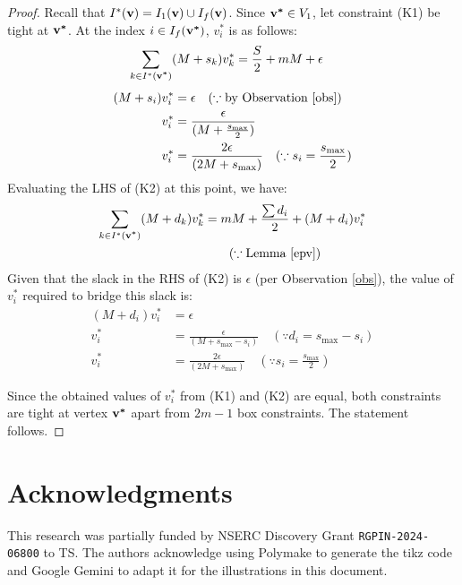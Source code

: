 \documentclass[3p, twocolumn]{elsarticle}
\def\ve#1{\mathchoice{\mbox{\boldmath$\displaystyle\bf#1$}}
{\mbox{\boldmath$\textstyle\bf#1$}}
{\mbox{\boldmath$\scriptstyle\bf#1$}}
{\mbox{\boldmath$\scriptscriptstyle\bf#1$}}}
\begin{document}
\begin{proof}
    Recall that $I^*(\ve{v}) = I_1(\ve{v}) \cup I_f(\ve{v})$. Since $\ve{v^*}\in V_1$, let constraint (K1) be tight at $\ve{v^*}$. At the index $i \in I_f(\ve{v^*})$, $v^*_i$ is as follows:
    \begin{align*}
    \sum_{k \in I^*(\ve{v^*})}(M+s_k)v^*_k &=  \frac{S}{2} + mM + \epsilon    
    \end{align*}
    \begin{align*}
        (M+s_i)v^*_i &= \epsilon \quad (\because \text{by Observation \ref{obs}}) \\
        v^*_i &= \frac{\epsilon}{(M+\frac{s_{\max}}{2})}\\
        v^*_i &= \frac{2\epsilon}{(2M+s_{\max})} \quad (\because s_i = \frac{s_{\max}}{2})
    \end{align*}
    Evaluating the LHS of (K2) at this point, we have:
    \begin{align*}
        \sum_{k \in I^*(\ve{v^*})}(M+d_k)v^*_k & = mM+ \frac{\sum d_i}{2}+ (M+d_i)v^*_i\\
        & \quad \quad (\because \text{Lemma \ref{epv}})
    \end{align*}
    Given that the slack in the RHS of (K2) is $\epsilon$ (per Observation \ref{obs}), the value of $v^*_i$ required to bridge this slack is:
    \begin{align*}
        (M+d_i)v^*_i &= \epsilon \\
        v^*_i &= \frac{\epsilon}{(M+s_{\max} -s_i)} \quad (\because d_i = s_{\max} - s_i)\\
        v^*_i &= \frac{2\epsilon}{(2M+s_{\max})} \quad (\because s_i = \frac{s_{\max}}{2})
    \end{align*}
    
    Since the obtained values of $v^*_i$ from (K1) and (K2) are equal, both constraints are tight at vertex $\ve{v^*}$ apart from $2m-1$ box constraints. The statement follows. 
\end{proof}

\section*{Acknowledgments}
This research was partially funded by NSERC Discovery Grant \texttt{RGPIN-2024-06800} to TS. The authors acknowledge using Polymake to generate the tikz code and Google Gemini to adapt it for the illustrations in this document.



 

\end{document}
